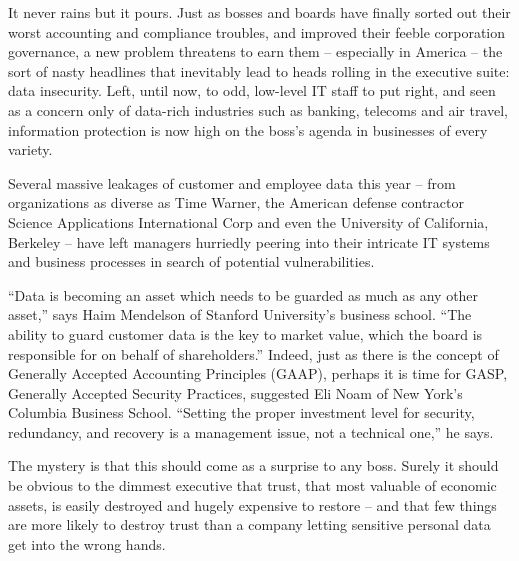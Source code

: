 \documentclass[a4paper]{article}
\begin{document}
\par
It never rains but it pours. Just as bosses and boards have finally sorted out their worst accounting and compliance troubles, and improved their feeble corporation governance, a new problem threatens to earn them – especially in America – the sort of nasty headlines that inevitably lead to heads rolling in the executive suite: data insecurity. Left, until now, to odd, low-level IT staff to put right, and seen as a concern only of data-rich industries such as banking, telecoms and air travel, information protection is now high on the boss’s agenda in businesses of every variety.

\par
Several massive leakages of customer and employee data this year – from organizations as diverse as Time Warner, the American defense contractor Science Applications International Corp and even the University of California, Berkeley – have left managers hurriedly peering into their intricate IT systems and business processes in search of potential vulnerabilities.

\par
“Data is becoming an asset which needs to be guarded as much as any other asset,” says Haim Mendelson of Stanford University’s business school. “The ability to guard customer data is the key to market value, which the board is responsible for on behalf of shareholders.” Indeed, just as there is the concept of Generally Accepted Accounting Principles (GAAP), perhaps it is time for GASP, Generally Accepted Security Practices, suggested Eli Noam of New York’s Columbia Business School. “Setting the proper investment level for security, redundancy, and recovery is a management issue, not a technical one,” he says.

\par
The mystery is that this should come as a surprise to any boss. Surely it should be obvious to the dimmest executive that trust, that most valuable of economic assets, is easily destroyed and hugely expensive to restore – and that few things are more likely to destroy trust than a company letting sensitive personal data get into the wrong hands.
\end{document}
